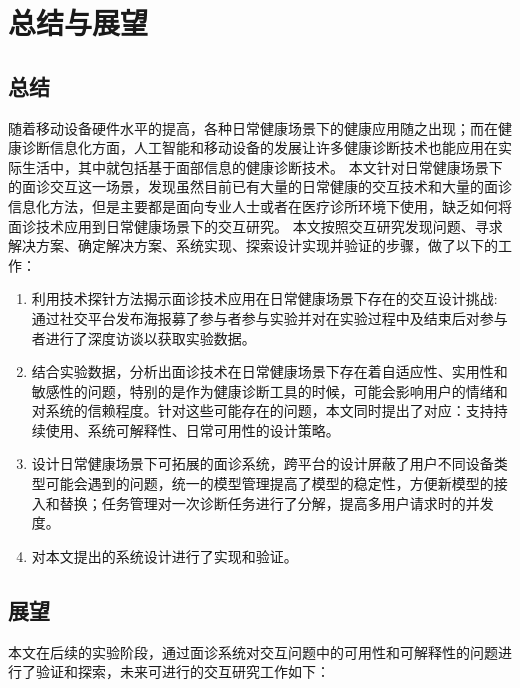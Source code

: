 \chapter{总结与展望}
\section{总结}
随着移动设备硬件水平的提高，各种日常健康场景下的健康应用随之出现；而在健康诊断信息化方面，人工智能和移动设备的发展让许多健康诊断技术也能应用在实际生活中，其中就包括基于面部信息的健康诊断技术。
本文针对日常健康场景下的面诊交互这一场景，发现虽然目前已有大量的日常健康的交互技术和大量的面诊信息化方法，但是主要都是面向专业人士或者在医疗诊所环境下使用，缺乏如何将面诊技术应用到日常健康场景下的交互研究。
本文按照交互研究发现问题、寻求解决方案、确定解决方案、系统实现、探索设计实现并验证的步骤，做了以下的工作：

\begin{enumerate}
	\item 利用技术探针方法揭示面诊技术应用在日常健康场景下存在的交互设计挑战: 通过社交平台发布海报募了参与者参与实验并对在实验过程中及结束后对参与者进行了深度访谈以获取实验数据。
	
	\item 结合实验数据，分析出面诊技术在日常健康场景下存在着自适应性、实用性和敏感性的问题，特别的是作为健康诊断工具的时候，可能会影响用户的情绪和对系统的信赖程度。针对这些可能存在的问题，本文同时提出了对应：支持持续使用、系统可解释性、日常可用性的设计策略。

	\item 设计日常健康场景下可拓展的面诊系统，跨平台的设计屏蔽了用户不同设备类型可能会遇到的问题，统一的模型管理提高了模型的稳定性，方便新模型的接入和替换；任务管理对一次诊断任务进行了分解，提高多用户请求时的并发度。

	\item 对本文提出的系统设计进行了实现和验证。
\end{enumerate}



\section{展望}
本文在后续的实验阶段，通过面诊系统对交互问题中的可用性和可解释性的问题进行了验证和探索，未来可进行的交互研究工作如下：

